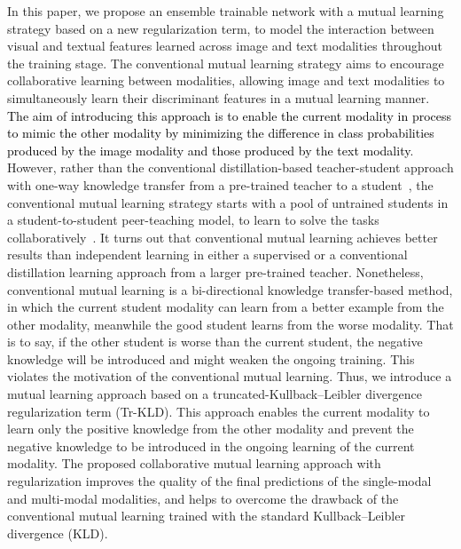 \documentclass[twocolumn]{svjour3}
\begin{document}
In this paper, we propose an ensemble trainable network with a mutual learning strategy based on a new regularization term, to model the interaction between visual and textual features learned across image and text modalities throughout the training stage. The conventional mutual learning strategy aims to encourage collaborative learning between modalities, allowing image and text modalities to simultaneously learn their discriminant features in a mutual learning manner. \textcolor{black}{The aim of introducing this approach is to enable the current modality in process to mimic the other modality by minimizing the difference in class probabilities produced by the image modality and those produced by the text modality}. However, rather than the conventional distillation-based teacher-student approach with one-way knowledge transfer from a pre-trained teacher to a student~\cite{hinton2015distilling}, the conventional mutual learning strategy starts with a pool of untrained students in a student-to-student peer-teaching model, to learn to solve the tasks collaboratively~\cite{zhang2018deep}. It turns out that conventional mutual learning achieves better results than independent learning in either a supervised or a conventional distillation learning approach from a larger pre-trained teacher. Nonetheless, conventional mutual learning is a bi-directional knowledge transfer-based method, in which the current student modality can learn from a better example from the other modality, meanwhile the good student learns from the worse modality. That is to say, if the other student is worse than the current student, the negative knowledge will be introduced and might weaken the ongoing training. This violates the motivation of the conventional mutual learning.
Thus, we introduce a mutual learning approach based on a truncated-Kullback–Leibler divergence regularization term (Tr-KLD). This approach enables the current modality to learn only the positive knowledge from the other modality and prevent the negative knowledge to be introduced in the ongoing learning of the current modality. The proposed collaborative mutual learning approach with regularization improves the quality of the final predictions of the single-modal and multi-modal modalities, and helps to overcome the drawback of the conventional mutual learning trained with the standard Kullback–Leibler divergence (KLD).
\end{document}
